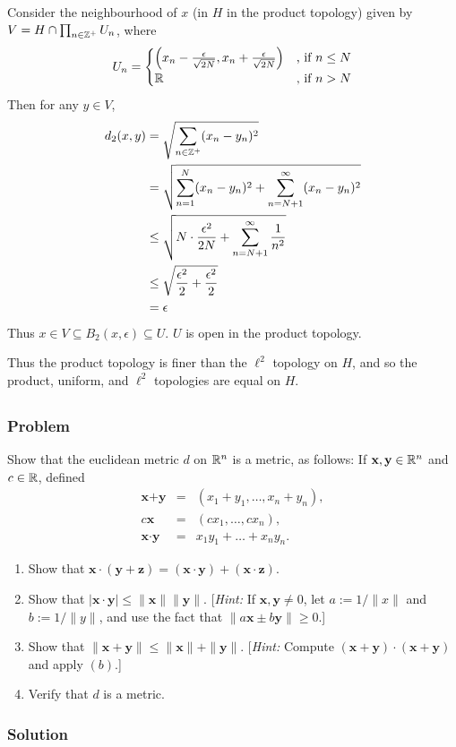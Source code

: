 \begin{enumerate}
Consider the neighbourhood of $x$ (in $H$ in the product topology) given by $ V = H \cap \prod_{n \in \mathbb Z^+} U_n$, where
\[U_n =
\begin{cases}
\left(x_n - \tfrac{\epsilon}{\sqrt{2N}}, x_n + \tfrac{\epsilon}{\sqrt{2N}} \right) & \textrm{, if } n \leq N \\
\mathbb R & \textrm{, if } n > N
\end{cases}
\]
Then for any $y \in V$,
\begin{align*}
d_2(x,y) &= \sqrt{\sum_{n\in\mathbb Z^+} (x_n-y_n)^2} \\
&= \sqrt{\sum_{n=1}^N (x_n-y_n)^2 + \sum_{n=N+1}^\infty (x_n-y_n)^2} \\
&\leq \sqrt{N \cdot \frac{\epsilon^2}{2N} + \sum_{n=N+1}^\infty \frac{1}{n^2}} \\
&\leq \sqrt{\frac{\epsilon^2}{2} + \frac{\epsilon^2}{2}} \\
&=\epsilon
\end{align*}
Thus $x \in V \subseteq B_2(x,\epsilon) \subseteq U$. $U$ is open in the product topology.

Thus the product topology is finer than the $\ell^2$ topology on $H$, and so the product, uniform, and $\ell^2$ topologies are equal on $H$.
\end{enumerate}


\setcounter{subsection}{8} %
\subsection{}

\subsubsection{Problem}
Show that the euclidean metric $d$ on $\mathbb R^n$ is a metric, as follows: If $\textbf{x}, \textbf{y} \in \mathbb R^n$ and $c \in \mathbb R$, defined
\begin{eqnarray*}
    \textbf{x} + \textbf{y} & = & (x_1+y_1, \dots, x_n+y_n),\\
    c\textbf{x} & = & (cx_1, \dots, cx_n),\\
    \textbf{x}\cdot\textbf{y} & = & x_1y_1 + \dots + x_ny_n.
\end{eqnarray*}
\begin{enumerate}
    \item Show that $\textbf{x}\cdot(\textbf{y} + \textbf{z}) = (\textbf{x}\cdot\textbf{y}) + (\textbf{x}\cdot\textbf{z})$.
    \item Show that $|\textbf{x}\cdot\textbf{y}| \leq \|\textbf{x}\|\|\textbf{y}\|$. [\emph{Hint:} If $\textbf{x}, \textbf{y} \neq 0$, let $a := 1/\|x\|$ and $b := 1/\|y\|$, and use the fact that $\|a\textbf{x} \pm b\textbf{y}\| \geq 0$.]
    \item Show that $\|\textbf{x} + \textbf{y}\| \leq \|\textbf{x}\| + \|\textbf{y}\|$. [\emph{Hint:} Compute $(\textbf{x} + \textbf{y})\cdot(\textbf{x} + \textbf{y})$ and apply $(b)$.]
    \item Verify that $d$ is a metric.
\end{enumerate}

\subsubsection{Solution}
\todo



